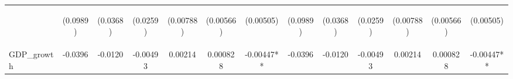 \documentclass[]{article}
\begin{document}
\begin{center}
\begin{tabular}{lcccccccccccc}
\vspace{4pt} & \begin{footnotesize}(0.0989)\end{footnotesize} & \begin{footnotesize}(0.0368)\end{footnotesize} & \begin{footnotesize}(0.0259)\end{footnotesize} & \begin{footnotesize}(0.00788)\end{footnotesize} & \begin{footnotesize}(0.00566)\end{footnotesize} & \begin{footnotesize}(0.00505)\end{footnotesize} & \begin{footnotesize}(0.0989)\end{footnotesize} & \begin{footnotesize}(0.0368)\end{footnotesize} & \begin{footnotesize}(0.0259)\end{footnotesize} & \begin{footnotesize}(0.00788)\end{footnotesize} & \begin{footnotesize}(0.00566)\end{footnotesize} & \begin{footnotesize}(0.00505)\end{footnotesize} \\
GDP\_growth & -0.0396 & -0.0120 & -0.00493 & 0.00214 & 0.000828 & -0.00447** & -0.0396 & -0.0120 & -0.00493 & 0.00214 & 0.000828 & -0.00447** \\

\end{tabular}
\end{center}
\end{document}

